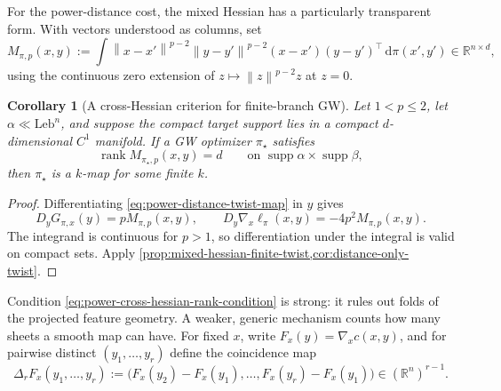 \documentclass[11pt,a4paper]{article}
\newtheorem{corollary}[theorem]{Corollary}
\theoremstyle{definition}
\theoremstyle{remark}
\newcommand{\R}{\mathbb R}
\newcommand{\supp}{\operatorname{supp}}
\newcommand{\rank}{\operatorname{rank}}
\newcommand{\dd}{\,\mathrm d}
\newcommand{\norm}[1]{\left\lVert #1\right\rVert}
\begin{document}
For the power-distance cost, the mixed Hessian has a particularly transparent
form.  With vectors understood as columns, set
\begin{equation}
  M_{\pi,p}(x,y)
  :=\int
  \norm{x-x'}^{p-2}\norm{y-y'}^{p-2}
  (x-x')(y-y')^\top\dd\pi(x',y')
  \in\R^{n\times d},
  \label{eq:power-cross-hessian}
\end{equation}
using the continuous zero extension of
\(z\mapsto\norm{z}^{p-2}z\) at \(z=0\).

\begin{corollary}[A cross-Hessian criterion for finite-branch GW]
\label{cor:power-cross-hessian-finite-map}
Let \(1<p\leq2\), let \(\alpha\ll\mathrm{Leb}^n\), and suppose the compact
target support lies in a compact \(d\)-dimensional \(C^1\) manifold.  If a
GW optimizer \(\pi_\star\) satisfies
\begin{equation}
  \rank M_{\pi_\star,p}(x,y)=d
  \qquad\text{on }\supp\alpha\times\supp\beta,
  \label{eq:power-cross-hessian-rank-condition}
\end{equation}
then \(\pi_\star\) is a \(k\)-map for some finite \(k\).
\end{corollary}

\begin{proof}
Differentiating \eqref{eq:power-distance-twist-map} in \(y\) gives
\begin{equation}
  D_yG_{\pi,x}(y)=pM_{\pi,p}(x,y),
  \qquad
  D_y\nabla_x\ell_\pi(x,y)=-4p^2M_{\pi,p}(x,y).
  \label{eq:power-mixed-hessian-identity}
\end{equation}
The integrand is continuous for \(p>1\), so differentiation under the
integral is valid on compact sets.  Apply
\cref{prop:mixed-hessian-finite-twist,cor:distance-only-twist}.
\end{proof}

Condition \eqref{eq:power-cross-hessian-rank-condition} is strong: it rules
out folds of the projected feature geometry.  A weaker, generic mechanism
counts how many sheets a smooth map can have.  For fixed \(x\), write
\(F_x(y)=\nabla_xc(x,y)\), and for pairwise distinct
\((y_1,\ldots,y_r)\) define the coincidence map
\begin{equation}
  \Delta_rF_x(y_1,\ldots,y_r)
  :=\bigl(F_x(y_2)-F_x(y_1),\ldots,
          F_x(y_r)-F_x(y_1)\bigr)
  \in(\R^n)^{r-1}.
  \label{eq:multijet-coincidence-map}
\end{equation}
\end{document}
